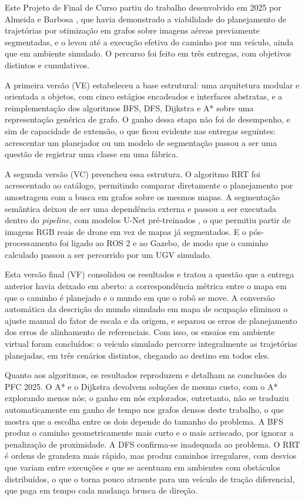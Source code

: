 \documentclass[
    12pt,
    openright,
    oneside,
    a4paper,
    english,
    brazil
]{abntex2}
\begin{document}
Este Projeto de Final de Curso partiu do trabalho desenvolvido em 2025 por Almeida e Barbosa \cite{camelo2025}, que havia demonstrado a viabilidade do planejamento de trajetórias por otimização em grafos sobre imagens aéreas previamente segmentadas, e o levou até a execução efetiva do caminho por um veículo, ainda que em ambiente simulado. O percurso foi feito em três entregas, com objetivos distintos e cumulativos.

A primeira versão (VE) estabeleceu a base estrutural: uma arquitetura modular e orientada a objetos, com cinco estágios encadeados e interfaces abstratas, e a reimplementação dos algoritmos BFS, DFS, Dijkstra e A* sobre uma representação genérica de grafo. O ganho dessa etapa não foi de desempenho, e sim de capacidade de extensão, o que ficou evidente nas entregas seguintes: acrescentar um planejador ou um modelo de segmentação passou a ser uma questão de registrar uma classe em uma fábrica.

A segunda versão (VC) preencheu essa estrutura. O algoritmo RRT foi acrescentado ao catálogo, permitindo comparar diretamente o planejamento por amostragem com a busca em grafos sobre os mesmos mapas. A segmentação semântica deixou de ser uma dependência externa e passou a ser executada dentro do \textit{pipeline}, com modelos U-Net pré-treinados \cite{junior2024_models}, o que permitiu partir de imagens RGB reais de drone em vez de mapas já segmentados. E o pós-processamento foi ligado ao ROS 2 e ao Gazebo, de modo que o caminho calculado passou a ser percorrido por um UGV simulado.

Esta versão final (VF) consolidou os resultados e tratou a questão que a entrega anterior havia deixado em aberto: a correspondência métrica entre o mapa em que o caminho é planejado e o mundo em que o robô se move. A conversão automática da descrição do mundo simulado em mapa de ocupação eliminou o ajuste manual do fator de escala e da origem, e separou os erros de planejamento dos erros de alinhamento de referenciais. Com isso, os ensaios em ambiente virtual foram concluídos: o veículo simulado percorre integralmente as trajetórias planejadas, em três cenários distintos, chegando ao destino em todos eles.

Quanto aos algoritmos, os resultados reproduzem e detalham as conclusões do PFC 2025. O A* e o Dijkstra devolvem soluções de mesmo custo, com o A* explorando menos nós; o ganho em nós explorados, entretanto, não se traduziu automaticamente em ganho de tempo nos grafos densos deste trabalho, o que mostra que a escolha entre os dois depende do tamanho do problema. A BFS produz o caminho geometricamente mais curto e o mais arriscado, por ignorar a penalização de proximidade. A DFS confirma-se inadequada ao problema. O RRT é ordens de grandeza mais rápido, mas produz caminhos irregulares, com desvios que variam entre execuções e que se acentuam em ambientes com obstáculos distribuídos, o que o torna pouco atraente para um veículo de tração diferencial, que paga em tempo cada mudança brusca de direção.
\end{document}
